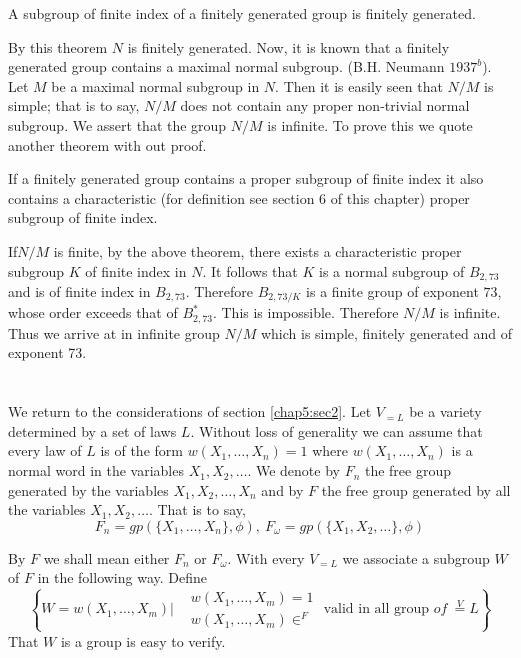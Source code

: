 \begin{theorem*} 
  A subgroup
  of finite index of a finitely generated group is finitely
  generated. 
\end{theorem*}

By this theorem $N$ is finitely generated. Now, it is known that a
finitely generated group contains a maximal normal
subgroup. (B.H. Neumann $1937^b$). Let $M$ be a maximal normal
subgroup in $N$. 
Then it is easily seen that $N/M$ is simple; that is to say, $N/M$
does not contain any proper non-trivial normal subgroup. We assert
that the group $N/M$ is infinite. To prove this we quote another
theorem with out proof. 

\begin{theorem*}[(R. Baer $1953$)]
  If a finitely generated group contains a prop\-er subgroup of finite
  index it also contains a characteristic (for definition see section
  6 of this chapter) proper subgroup of finite index. 
\end{theorem*}

If\pageoriginale $N/M$ is finite, by the above theorem, there exists a
characteristic proper subgroup $K$ of finite index in $N$. It follows
that $K$ is a normal subgroup of $B_{2,73}$ and is of finite index
in $B_{2,73}$. Therefore $B_{2,73/K}$ is a finite group of exponent
$73$, whose order exceeds that of $B^*_{2,73}$. This is
impossible. Therefore $N/M$ is infinite. Thus we arrive at in infinite
group $N/M$ which is simple, finitely generated and of exponent 73. 

\section{}\label{chap5:sec5}%

We return to the considerations of section \ref{chap5:sec2}. Let $V_{=L}$ be a
variety determined by a set of laws $L$. Without loss of generality we
can assume that every law of $L$ is of the form $w(X_1,\ldots,X_n)=1$
where $w(X_1,\ldots,X_n)$ is a normal word in the variables $X_1,
X_2,\ldots$. We denote by $F_n$ the free group generated by the
variables $X_1, X_2, \ldots,X_n$ and by $F$ the free group generated
by all the variables $X_1, X_2,\ldots$. That is to say, 
$$
F_n =gp\left(\bigg \{X_1,\ldots, X_n \bigg \}, \phi\right),~F_\omega = gp
\left(\bigg\{X_1, X_2,\ldots \bigg\}, \phi\right) 
$$

By $F$ we shall mean either $F_n$ or $F_\omega$. With every $V_{=L}$
we associate a subgroup $W$ of $F$ in the following way. Define 
\begin{equation*}
  \left\{
  W=
  w(X_1,\ldots,X_m) \Bigg|
  \begin{aligned}
    & w(X_1,\ldots,X_m)=1 \\
    & w(X_1,\ldots,X_m) \in ^F
  \end{aligned}
  \text{ valid in all group } of ~\overset{V}{=}L
  \right\}
\end{equation*}
That $W$ is a group is easy to verify.

